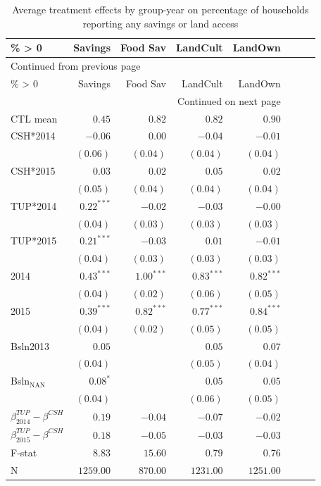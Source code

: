 \documentclass[12pt,article]{article}
\begin{document}
\begin{longtable}{lrrrrrrr}
\caption{\label{tab:orgtable5}
Average treatment effects by group-year on percentage of households reporting any savings or land access}
\\
\hline
\% > 0 & Savings & Food Sav & LandCult & LandOwn\\
\hline
\endfirsthead
\multicolumn{5}{l}{Continued from previous page} \\
\hline

\% > 0 & Savings & Food Sav & LandCult & LandOwn \\

\hline
\endhead
\hline\multicolumn{5}{r}{Continued on next page} \\
\endfoot
\endlastfoot
\hline
CTL mean & \(0.45\) & \(0.82\) & \(0.82\) & \(0.90\)\\
\hline
CSH*2014 & \(-0.06\) & \(0.00\) & \(-0.04\) & \(-0.01\)\\
 & \(( 0.06)\) & \(( 0.04)\) & \(( 0.04)\) & \(( 0.04)\)\\
CSH*2015 & \(0.03\) & \(0.02\) & \(0.05\) & \(0.02\)\\
 & \(( 0.05)\) & \(( 0.04)\) & \(( 0.04)\) & \(( 0.04)\)\\
TUP*2014 & \(0.22^{***}\) & \(-0.02\) & \(-0.03\) & \(-0.00\)\\
 & \(( 0.04)\) & \(( 0.03)\) & \(( 0.03)\) & \(( 0.03)\)\\
TUP*2015 & \(0.21^{***}\) & \(-0.03\) & \(0.01\) & \(-0.01\)\\
 & \(( 0.04)\) & \(( 0.03)\) & \(( 0.03)\) & \(( 0.03)\)\\
2014 & \(0.43^{***}\) & \(1.00^{***}\) & \(0.83^{***}\) & \(0.82^{***}\)\\
 & \(( 0.04)\) & \(( 0.02)\) & \(( 0.06)\) & \(( 0.05)\)\\
2015 & \(0.39^{***}\) & \(0.82^{***}\) & \(0.77^{***}\) & \(0.84^{***}\)\\
 & \(( 0.04)\) & \(( 0.02)\) & \(( 0.05)\) & \(( 0.05)\)\\
Bsln2013 & \(0.05\) &  & \(0.05\) & \(0.07\)\\
 & \(( 0.04)\) &  & \(( 0.05)\) & \(( 0.04)\)\\
Bsln\(_{\text{NAN}}\) & \(0.08^{*}\) &  & \(0.05\) & \(0.05\)\\
 & \(( 0.04)\) &  & \(( 0.06)\) & \(( 0.05)\)\\
\hline
\(\beta^{TUP}_{2014}-\beta^{CSH}\) & \(0.19\) & \(-0.04\) & \(-0.07\) & \(-0.02\)\\
\(\beta^{TUP}_{2015}-\beta^{CSH}\) & \(0.18\) & \(-0.05\) & \(-0.03\) & \(-0.03\)\\
\hline
F-stat & \(8.83\) & \(15.60\) & \(0.79\) & \(0.76\)\\
N & \(1259.00\) & \(870.00\) & \(1231.00\) & \(1251.00\)\\
\hline
\end{longtable}
\end{document}
